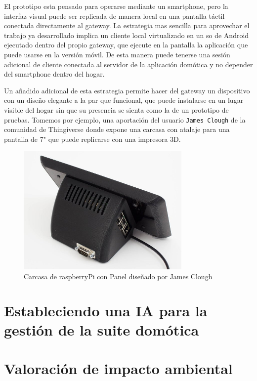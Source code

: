 El prototipo esta pensado para operarse mediante un smartphone, pero la interfaz visual puede ser replicada de manera local en una pantalla táctil conectada directamente al \gls{gateway}. La estrategia mas sencilla para aprovechar el trabajo ya desarrollado implica un cliente local virtualizado en un \gls{so} de Android ejecutado dentro del propio \gls{gateway}, que ejecute en la pantalla la aplicación que puede usarse en la versión móvil. De esta manera puede tenerse una sesión adicional de cliente conectada al servidor de la aplicación domótica y no depender del smartphone dentro del hogar.

\vspace{1cm}

Un añadido adicional de esta estrategia permite hacer del \gls{gateway} un dispositivo con un diseño elegante a la par que funcional, que puede instalarse en un lugar visible del hogar sin que su presencia se sienta como la de un prototipo de pruebas. Tomemos por ejemplo, una aportación del usuario \verb|James Clough| de la comunidad de Thingiverse\cite{raspberry_case_7} donde expone una carcasa con atalaje para una pantalla de 7" que puede replicarse con una impresora 3D.

\begin{figure}[hbt!]
\centering
\includegraphics[height=2.5in]{figures/raspberrypicase7_preview_featured.jpg}
\caption[Carcasa de raspberryPi con Panel]{Carcasa de raspberryPi con Panel diseñado por James Clough\footnotemark}
\end{figure}


\section{Estableciendo una IA para la gestión de la suite domótica}
\label{ch:Capitulo6.6}

\section{Valoración de impacto ambiental}
\label{ch:Capitulo6.7}

